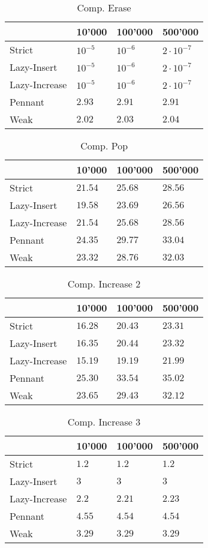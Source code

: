 \documentclass{DIKU-article}[2010/01/13]
\begin{document}
\begin{table}[h!]
\centering
\caption{Comp. Erase}
\begin{tabular}{l|lll}
 & 10'000 & 100'000 & 500'000 \\
\hline
Strict & $10^{-5}$ & $10^{-6}$ & $2\cdot 10^{-7}$ \\
Lazy-Insert & $10^{-5}$ & $10^{-6}$ & $2\cdot 10^{-7}$ \\
Lazy-Increase & $10^{-5}$ & $10^{-6}$ & $2\cdot 10^{-7}$ \\
Pennant & $2.93$ & $2.91$ & $2.91$ \\
Weak & $2.02$ & $2.03$ & $2.04$

\end{tabular}
\end{table}

\begin{table}[h!]
\centering
\caption{Comp. Pop}
\begin{tabular}{l|lll}
 & 10'000 & 100'000 & 500'000 \\
\hline
Strict & $21.54$ & $25.68$ & $28.56$ \\
Lazy-Insert & $19.58$ & $23.69$ & $26.56$ \\
Lazy-Increase & $21.54$ & $25.68$ & $28.56$ \\
Pennant & $24.35$ & $29.77$ & $33.04$ \\
Weak & $23.32$ & $28.76$ & $32.03$

\end{tabular}
\end{table}

\begin{table}[h!]
\centering
\caption{Comp. Increase 2}
\begin{tabular}{l|lll}
& 10'000 & 100'000 & 500'000 \\
\hline
Strict & $16.28$ & $20.43$ & $23.31$ \\
Lazy-Insert & $16.35$ & $20.44$ & $23.32$ \\
Lazy-Increase & $15.19$ & $19.19$ & $21.99$ \\
Pennant & $25.30$ & $33.54$ & $35.02$ \\
Weak & $23.65$ & $29.43$ & $32.12$

\end{tabular}
\end{table}

\begin{table}[h!]
\centering
\caption{Comp. Increase 3}
\begin{tabular}{l|lll}
\label{tab:comp.last}
& 10'000 & 100'000 & 500'000 \\
\hline
Strict & $1.2$ & $1.2$ & $1.2$ \\
Lazy-Insert & $3$ & $3$ & $3$ \\
Lazy-Increase & $2.2$ & $2.21$ & $2.23$ \\
Pennant & $4.55$ & $4.54$ & $4.54$ \\
Weak & $3.29$ & $3.29$ & $3.29$


\end{tabular}
\end{table}
\end{document}

